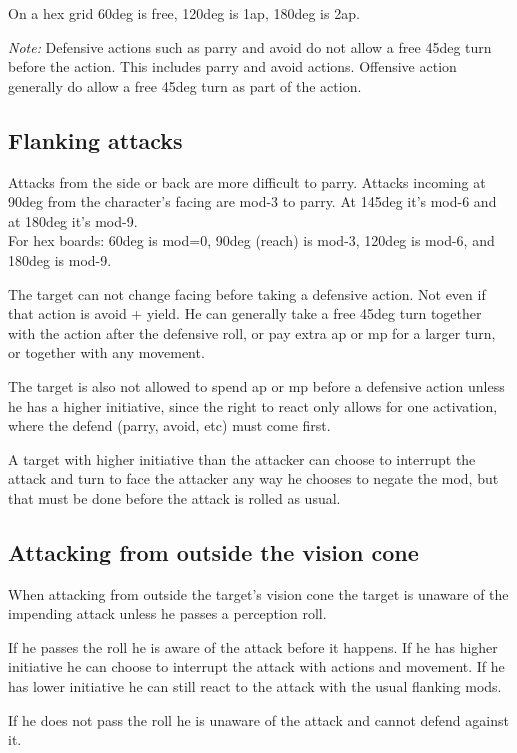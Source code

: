 On a hex grid 60deg is free, 120deg is 1ap, 180deg is 2ap.

\emph{Note:} Defensive actions such as parry and avoid do not allow a free 45deg turn before the action. This includes parry and avoid actions. Offensive action generally do allow a free 45deg turn as part of the action.


\subsection*{Flanking attacks}
Attacks from the side or back are more difficult to parry. Attacks incoming at 90deg from the character's facing are mod-3 to parry. At 145deg it's mod-6 and at 180deg it's mod-9.\\
For hex boards: 60deg is mod=0, 90deg (reach) is mod-3, 120deg is mod-6, and 180deg is mod-9.

The target can not change facing before taking a defensive action. Not even if that action is avoid + yield. He can generally take a free 45deg turn together with the action after the defensive roll, or pay extra ap or mp for a larger turn, or together with any movement.

The target is also not allowed to spend ap or mp before a defensive action unless he has a higher initiative, since the right to react only allows for one activation, where the defend (parry, avoid, etc) must come first.

A target with higher initiative than the attacker can choose to interrupt the attack and turn to face the attacker any way he chooses to negate the mod, but that must be done before the attack is rolled as usual.


\subsection*{Attacking from outside the vision cone}
When attacking from outside the target's vision cone the target is unaware of the impending attack unless he passes a perception roll.

If he passes the roll he is aware of the attack before it happens. If he has higher initiative he can choose to interrupt the attack with actions and movement. If he has lower initiative he can still react to the attack with the usual flanking mods.

If he does not pass the roll he is unaware of the attack and cannot defend against it.

